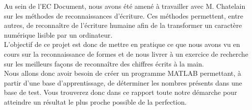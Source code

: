 Au sein de l'EC Document, nous avons été amené à travailler
avec M. Chatelain sur les méthodes de reconnaissances d'écriture.
Ces méthodes permettent, entre autres, de reconnaître de 
l'écriture humaine afin de la transformer un caractère numérique
lisible par un ordinateur. \\
L'objectif de ce projet est donc de mettre en pratique ce que
nous avons vu en cours sur la reconnaissance de formes et de nous
livrer à un exercice de recherche sur les meilleurs façons de 
reconnaître des chiffres écrits à la main. \\
Nous allons donc avoir besoin de créer un programme MATLAB
permettant, à partir d'une base d'apprentissage, de déterminer les
nombres présents dans une base de test. Vous trouverez donc dans
ce rapport toute notre démarche pour atteindre un résultat le plus
proche possible de la perfection. 